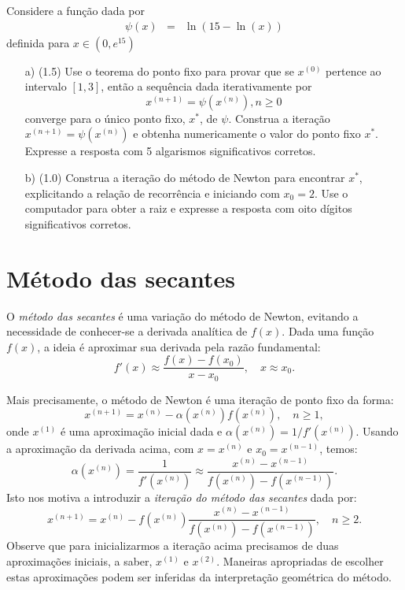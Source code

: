 \begin{exer} Considere a função dada por
\begin{eqnarray*}
\psi(x)&=&\ln\left(15-\ln(x)\right)
\end{eqnarray*}
definida para $x\in \left(0,e^{15}\right)$
\begin{itemize}
\item [a)] (1.5) Use o teorema do ponto fixo para provar que se $x^{(0)}$ pertence ao intervalo $[1,3]$, então a sequência dada iterativamente por $$x^{(n+1)}=\psi(x^{(n)}),n\geq 0$$ converge para o único ponto fixo, $x^*$, de $\psi$. Construa a iteração $x^{(n+1)}=\psi(x^{(n)})$ e obtenha numericamente o valor do ponto fixo $x^*$. Expresse a resposta com 5 algarismos significativos corretos.
\item [b)] (1.0) Construa a iteração do método de Newton para encontrar $x^*$, explicitando a relação de recorrência e iniciando com $x_0=2$. Use o computador para obter a raiz e expresse a resposta com oito dígitos significativos corretos.
\end{itemize}
\end{exer}

\section{Método das secantes}

O \emph{método das secantes} é uma variação do método de Newton, evitando a necessidade de conhecer-se a derivada analítica de $f(x)$. Dada uma função $f(x)$, a ideia é aproximar sua derivada pela razão fundamental:
\begin{equation*}
  f'(x)\approx \frac{f(x)-f(x_0)}{x-x_0},\quad x\approx x_0.
\end{equation*}

Mais precisamente, o método de Newton é uma iteração de ponto fixo da forma:
\begin{equation*}
  x^{(n+1)} = x^{(n)} - \alpha(x^{(n)})f(x^{(n)}),\quad n\geq 1,
\end{equation*}
onde $x^{(1)}$ é uma aproximação inicial dada e $\alpha(x^{(n)}) = 1/f'(x^{(n)})$. Usando a aproximação da derivada acima, com $x = x^{(n)}$ e $x_0 = x^{(n-1)}$, temos:
\begin{equation*}
  \alpha(x^{(n)}) = \frac{1}{f'(x^{(n)})} \approx  \frac{x^{(n)} - x^{(n-1)}}{f(x^{(n)}) - f(x^{(n-1)})}.
\end{equation*}
Isto nos motiva a introduzir a \emph{iteração do método das secantes} dada por:
\begin{equation*}
  x^{(n+1)} = x^{(n)} - f(x^{(n)})\frac{x^{(n)} - x^{(n-1)}}{f(x^{(n)}) - f(x^{(n-1)})},\quad n\geq 2.
\end{equation*}
Observe que para inicializarmos a iteração acima precisamos de duas aproximações iniciais, a saber, $x^{(1)}$ e $x^{(2)}$. Maneiras apropriadas de escolher estas aproximações podem ser inferidas da interpretação geométrica do método.

